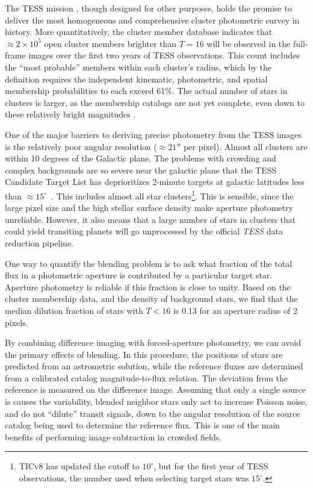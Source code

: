 \documentclass[12pt,twocolumn,tighten]{aastex62}
\begin{document}
The TESS mission \citep{ricker_transiting_2015}, though designed for
other purposes, holds the promise to deliver the most homogeneous and
comprehensive cluster photometric survey in history.  More
quantitatively, the \citet{Kharchenko_et_al_2013} cluster member
database indicates that $\approx 2\times10^5$ open cluster members
brighter than $T=16$ will be observed in the full-frame images over
the first two years of TESS observations.  This count includes the
``most probable'' members within each cluster's radius, which by the
\citet[][]{kharchenko_global_2012} definition requires the independent
kinematic, photometric, and spatial membership probabilities to each
exceed 61\%.  The actual number of stars in clusters is larger, as the
membership catalogs are not yet complete, even down to these
relatively bright magnitudes \citep[{\it
e.g.},][]{roser_nine_RSG_2016,cantat-gaudin_gaia_2018,cantat-gaudin_newOCs_2019}.

One of the major barriers to deriving precise photometry from the TESS
images is the relatively poor angular resolution ($\approx 21''$ per
pixel).  Almost all clusters are within 10 degrees of the Galactic
plane. The problems with crowding and complex backgrounds are so
severe near the galactic plane that the TESS Candidate Target List has
deprioritizes 2-minute targets at galactic latitudes less than
$\approx 15^\circ$~\citep{stassun_TIC_2018,stassun_TIC8_2019}. This
includes almost all star clusters\footnote{TICv8 has updated the cutoff to
$10^\circ$, but for the first year of TESS observations, the number
used when selecting target stars was $15^\circ$.}.  This is sensible,
since the large pixel size and the high stellar surface density
make aperture photometry unreliable.  
However, it also means that a
large number of stars in clusters that could yield transiting planets
will go unprocessed by the official {\it TESS} data reduction
pipeline.

One way to quantify the blending problem is to ask what fraction of
the total flux in a photometric aperture is contributed by a
particular target star. Aperture photometry is reliable if this
fraction is close to unity.  Based on the
\citet{Kharchenko_et_al_2013} cluster membership data, and the density
of background stars, we find that the median dilution fraction of
stars with $T< 16$ is 0.13 for an aperture radius of 2 pixels.

By combining difference imaging \citep{Alard_Lupton_1998,miller_optimal_2008} 
with forced-aperture photometry, we
can avoid the primary effects of blending.  
In this procedure, the positions of stars are predicted from an 
astrometric solution, while the reference fluxes are determined from a
calibrated catalog magnitude-to-flux relation.  The deviation from the
reference is measured on the difference image.  Assuming that only a
single source is causes the variability, blended neighbor stars only
act to increase Poisson noise, and do not ``dilute'' transit
signals, down to the angular resolution of the source catalog being
used to determine the reference flux.  This is one of the main
benefits of performing image subtraction in crowded fields.
\end{document}
